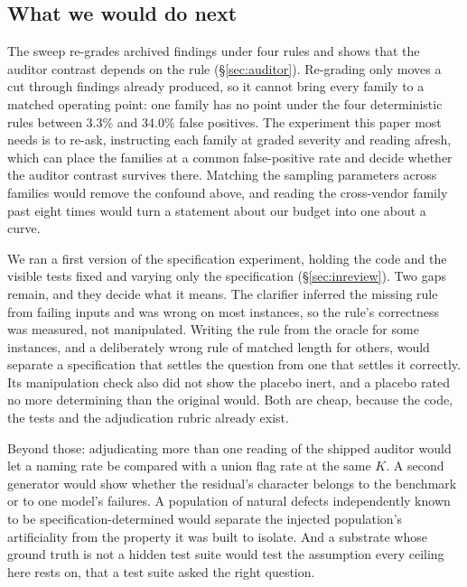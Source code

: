 \subsection{What we would do next}

The sweep re-grades archived findings under four rules and shows that the auditor contrast
depends on the rule (\S\ref{sec:auditor}). Re-grading only moves a cut through findings already
produced, so it cannot bring every family to a matched operating point: one family has no point
under the four deterministic rules between 3.3\% and 34.0\% false positives. The experiment this
paper most needs is to re-ask, instructing each family at graded severity and reading afresh,
which can place the families at a common false-positive rate and decide whether the auditor
contrast survives there. Matching the sampling parameters across families would remove the
confound above, and reading the cross-vendor family past eight times would turn a statement about
our budget into one about a curve.

We ran a first version of the specification experiment, holding the code and the visible tests
fixed and varying only the specification (\S\ref{sec:inreview}). Two gaps remain, and they decide
what it means. The clarifier inferred the missing rule from failing inputs and was wrong on most
instances, so the rule's correctness was measured, not manipulated. Writing the rule from the
oracle for some instances, and a deliberately wrong rule of matched length for others, would
separate a specification that settles the question from one that settles it correctly. Its
manipulation check also did not show the placebo inert, and a placebo rated no more determining
than the original would. Both are cheap, because the code, the tests and the adjudication rubric
already exist.

Beyond those: adjudicating more than one reading of the shipped auditor would let a naming rate be
compared with a union flag rate at the same $K$. A second generator would show whether the
residual's character belongs to the benchmark or to one model's failures. A population of natural
defects independently known to be specification-determined would separate the injected
population's artificiality from the property it was built to isolate. And a substrate whose ground
truth is not a hidden test suite would test the assumption every ceiling here rests on, that a
test suite asked the right question.
